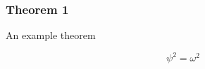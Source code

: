 \documentclass{beamer}
\begin{document}
\begin{frame}
    \frametitle{Theorem 1}
    An example theorem
    \pause
    \begin{theorem}
        \[\psi^2 = \omega^2\]
    \end{theorem}
\end{frame}
\end{document}
